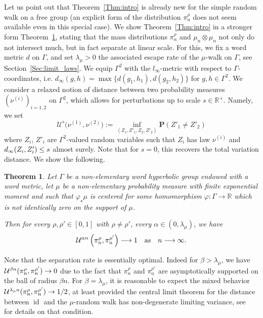 \documentclass[10pt]{amsart}
\newtheorem{theo}{Theorem}[section]
\theoremstyle{definition}\newtheorem{defi}[theo]{Definition}\newtheorem{rema}[theo]{Remark}\newtheorem{exam}[theo]{Example}\newtheorem{exem}[theo]{Example}\newtheorem{nota}[theo]{Notation}
\DeclareMathOperator{\id}{id}
\newcommand{\cU}{\mathcal{U}}
\newcommand{\R}{\mathbb{R}}
\newcommand{\Pb}{\mathbf{P}}
\renewcommand{\(}{\left(}
\renewcommand{\)}{\right)}
\renewcommand*{\to}{\mathchoice{\longrightarrow}{\rightarrow}{\rightarrow}{\rightarrow}}
\begin{document}
Let us point out that Theorem~\ref{Thm:intro} is already new for the simple random walk on a free group (an explicit form of the distribution $\pi^\rho_n$ does not seem available even in this special case). We show Theorem~\ref{Thm:intro} in a stronger form Theorem~\ref{Thm:harmonic}, stating that the mass distributions $\pi^\rho_n$ and $\mu_n\otimes\mu_n$ not only do not intersect much, but in fact separate at linear scale. For this, we fix a word metric $d$ on $\Gamma$, and set $\lambda_{\mu}>0$ the associated escape rate of the $\mu$-walk on $\Gamma$, see Section~\ref{Sec:limit_laws}. We equip $\Gamma^2$ with the $l_{\infty}$-metric with respect to $\Gamma$-coordinates, i.e. $d_\infty(g,h)=\max\{d(g_{1},h_{1}), d(g_{2},h_{2})\}$ for $g,h\in \Gamma^2$. We consider a relaxed notion of distance between two probability measures $(\nu^{(i)})_{i=1,2}$ on $\Gamma^2$, which allows for perturbations up to scale $s\in \R^+$. Namely, we set
\[
\cU^s\bigl(\nu^{(1)}, \nu^{(2)}\bigr) :=\inf_{\left(Z_{1},Z'_{1}, Z_{2}, Z'_{2}\right)} \Pb\left(Z'_{1}\neq Z'_{2}\right)
\]
where $Z_{i}$, $Z'_{i}$ are $\Gamma^2$-valued random variables such that $Z_{i}$ has law $\nu^{(i)}$ and $d_{\infty}(Z_{i},\linebreak Z'_{i})\leq s$ almost surely. Note that for $s=0$, this recovers the total variation distance. We show the following.


\begin{theo}\label{Thm:harmonic}
Let $\Gamma$ be a non-elementary word hyperbolic group endowed with a word metric, let $\mu$ be a non-elementary probability measure with finite exponential moment and such that $\varphi_{\star}\mu$ is centered for some homomorphism $\varphi : \Gamma\rightarrow \R$ which is not identically zero on the support of $\mu$.

Then for every $\rho, \rho' \in [0, 1]$ with $\rho \neq \rho'$, every $\alpha\in (0, \lambda_{\mu})$, we have
\[
\cU^{\alpha n}\left(\pi_{n}^\rho, \pi_{n}^{\rho'}\right) \to 1 \quad \text{as}\quad n \to \infty.
\]
\end{theo}


Note that the separation rate is essentially optimal. Indeed for $\beta>\lambda_{\mu}$, we have $\cU^{\beta n}(\pi_{n}^\rho, \pi_{n}^{\rho'}) \to 0 $ due to the fact that $\pi_{n}^\rho$ and $\pi_{n}^{\rho'}$ are asymptotically supported on the ball of radius $\beta n$. For $\beta=\lambda_{\mu}$, it is reasonable to expect the mixed behavior $\cU^{\lambda_{\mu} n}(\pi_{n}^\rho, \pi_{n}^{\rho'}) \to 1/2$, at least provided the central limit theorem for the distance between $\id$ and the $\mu$-random walk has non-degenerate limiting variance, see~\cite{BenoistQuintCLThyperbolic} for details on that condition.
\end{document}
